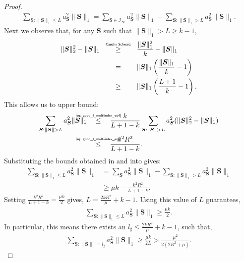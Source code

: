 \documentclass[final,12pt]{colt2018} %
\newcommand{\explain}[2]{\mathrel{\overset{\makebox[0pt]{\mbox{\normalfont\tiny\sffamily #1}}}{#2}}}
\renewcommand\v[1]{{\ensuremath{\boldsymbol{#1}}}}
\begin{document}
\begin{proof}
\begin{align}
    \sum_{{\v S}: \|{\v S}\|_1 \leq L} a_{\v S}^2 \|{\v S}\|_1 = \sum_{{\v S} \in \mathcal{I}_\infty} a_{\v S}^2 \|{\v S}\|_1 - \sum_{{\v S}: \|{\v S}\|_1 > L} a_{\v S}^2 \|{\v S}\|_1. \label{eq: good_l_multiindex_eq1}
\end{align}
Next we observe that, for any ${\v S}$ such that $\|{\v S}\|_1 > L \geq k-1$,
\begin{align}
    \|{\v S}\|_2^2 - \|{\v S}\|_1   & \qquad \explain{Cauchy Schwarz}{\geq} \qquad \frac{\|{\v S}\|_1^2}{k} - \|{\v S}\|_1 \nonumber \\
    & \qquad = \qquad \|{\v S}\|_1 \left( \frac{\|{\v S}\|_1}{k} - 1 \right) \nonumber \\
    & \qquad \geq \qquad \|{\v S}\|_1 \left( \frac{L+1}{k}  - 1\right)  \label{eq: good_l_multiindex_eq4}.
\end{align}
This allows us to upper bound:
\begin{align}
\sum_{{\v S}: \|{\v S}\| > L} a_{\v S}^2 \|{\v S}\|_1 & \quad \explain{\cref{eq: good_l_multiindex_eq4}}{\leq} \quad \frac{k}{L+1 - k} \sum_{{\v S}: \|{\v S}\| > L} a_{\v S}^2 (\|{\v S}\|_2^2 - \|{\v S}\|_1) \\
& \quad \explain{\cref{eq: good_l_multiindex_eq3}}{\leq} \quad \frac{k^2R^2}{L+1-k}.
\label{eq: good_l_multiindex_eq5}
\end{align}
Substituting the bounds obtained in  and  into  gives:
\begin{align*}
    \sum_{{\v S}: \|{\v S}\|_1 \leq L} a_{\v S}^2 \|{\v S}\|_1 &= \sum_{{\v S}} a_{\v S}^2 \|{\v S}\|_1 - \sum_{{\v S}: \|{\v S}\|_1 > L} a_{\v S}^2 \|{\v S}\|_1 \\
    & \geq \mu k - \frac{k^2 R^2}{L+1-k}.
\end{align*}
Setting $\frac{k^2 R^2}{L+1-k} = \frac{\mu k}{2}$ gives, $L = \frac{2k R^2}{\mu} + k -1$. Using this value of $L$ guarantees,
\begin{align*}
    \sum_{{\v S}: \|{\v S}\|_1 \leq L} a_{\v S}^2 \|{\v S}\|_1 \geq \frac{\mu k}{2}.
\end{align*}
In particular, this means there exists an $l_\sharp \leq \frac{2k R^2}{\mu}+k-1$, such that, 
\begin{align*}
    \sum_{{\v S}: \|{\v S}\|_1 = l_\sharp} a_{\v S}^2 \|{\v S}\|_1 \geq \frac{\mu k}{2L} > \frac{\mu^2}{2(2R^2 + \mu)}.
\end{align*}
\end{proof}
\end{document}
